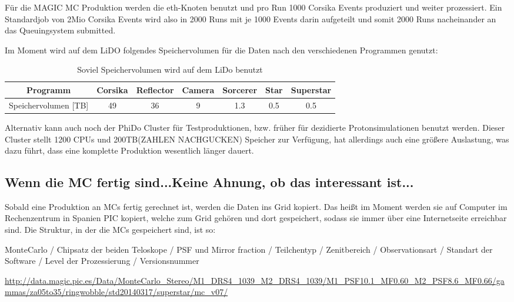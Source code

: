 Für die MAGIC MC Produktion werden die eth-Knoten benutzt und pro Run 1000 Corsika Events produziert und weiter prozessiert. 
Ein Standardjob von 2Mio Corsika Events wird also in 2000 Runs mit je 1000 Events darin aufgeteilt und somit 2000 Runs nacheinander an das Queuingsystem submitted.


Im Moment wird auf dem LiDO folgendes Speichervolumen für die Daten nach den verschiedenen Programmen genutzt:

\begin{table}[h!]
    \centering
    \caption{Soviel Speichervolumen wird auf dem LiDo benutzt}
    \label{tab:bsp}
    \begin{tabular}{ccccccc}
        \toprule
        Programm & Corsika & Reflector & Camera & Sorcerer & Star & Superstar\\
        \midrule
        Speichervolumen [TB] & 49 & 36 & 9 & 1.3 & 0.5 & 0.5\\
        \bottomrule
    \end{tabular}
\end{table}

Alternativ kann auch noch der PhiDo Cluster für Testproduktionen, bzw. früher für dezidierte Protonsimulationen benutzt werden. 
Dieser Cluster stellt 1200 CPUs und 200TB(ZAHLEN NACHGUCKEN) Speicher zur Verfügung, hat allerdings auch eine größere Auslastung, was dazu führt, dass eine komplette Produktion wesentlich länger dauert.



\subsection{Wenn die MC fertig sind...Keine Ahnung, ob das interessant ist...}
\label{sec:Wenn die MCs fertig sind}
Sobald eine Produktion an MCs fertig gerechnet ist, werden die Daten ins Grid kopiert.
Das heißt im Moment werden sie auf Computer im Rechenzentrum in Spanien PIC kopiert, welche zum Grid gehören und dort gespeichert, sodass sie immer über eine Internetseite erreichbar sind.
Die Struktur, in der die MCs gespeichert sind, ist so: 

MonteCarlo / Chipsatz der beiden Teloskope / PSF und Mirror fraction / Teilchentyp / Zenitbereich / Observationsart / Standart der Software / Level der Prozessierung / Versionsnummer \newline

\url{http://data.magic.pic.es/Data/MonteCarlo_Stereo/M1_DRS4_1039_M2_DRS4_1039/M1_PSF10.1_MF0.60_M2_PSF8.6_MF0.66/gammas/za05to35/ringwobble/std20140317/superstar/mc_v07/}


